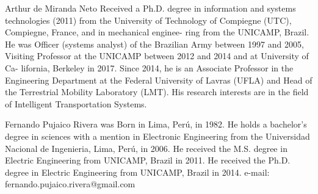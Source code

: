 \documentclass[letterpaper, 10 pt,conference]{ieeeconf}  %
\begin{document}
\begin{biography}{Arthur de Miranda Neto}
 Received a Ph.D. degree
in information and systems technologies (2011) from
the University of Technology of Compiegne (UTC),
Compiegne, France, and in mechanical enginee-
ring from the UNICAMP, Brazil. He was Officer
(systems analyst) of the Brazilian Army between
1997 and 2005, Visiting Professor at the UNICAMP
between 2012 and 2014 and at University of Ca-
lifornia, Berkeley in 2017. Since 2014, he is an
Associate Professor in the Engineering Department
at the Federal University of Lavras (UFLA) and
Head of the Terrestrial Mobility Laboratory (LMT). His research interests
are in the field of Intelligent Transportation Systems.
\end{biography}



\begin{biography}{Fernando Pujaico Rivera}
was Born in Lima, Perú, in 1982. 
He holds a
bachelor’s degree in sciences with a mention in Electronic Engineering from the
Universidad Nacional de Ingenieria, Lima, Perú, in 2006. 
He received the M.S. degree in Electric Engineering from UNICAMP, Brazil in 2011. 
He received the Ph.D. degree in Electric Engineering from UNICAMP, Brazil in 2014. 
e-mail: fernando.pujaico.rivera@gmail.com
\end{biography}
\end{document}
